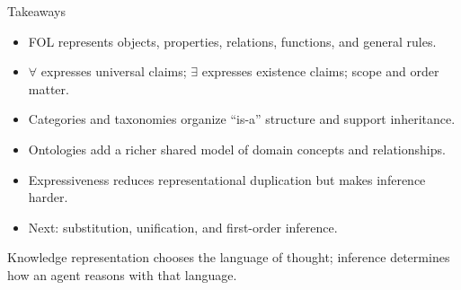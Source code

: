 \documentclass[aspectratio=169,10pt]{beamer}
\begin{document}
\begin{frame}[shrink=10]{Takeaways}
  \begin{itemize}
    \item FOL represents objects, properties, relations, functions, and general rules.
    \item $\forall$ expresses universal claims; $\exists$ expresses existence claims; scope and order matter.
    \item Categories and taxonomies organize ``is-a'' structure and support inheritance.
    \item Ontologies add a richer shared model of domain concepts and relationships.
    \item Expressiveness reduces representational duplication but makes inference harder.
    \item Next: substitution, unification, and first-order inference.
  \end{itemize}

  \begin{keyidea}
    Knowledge representation chooses the language of thought; inference determines how an agent reasons with that language.
  \end{keyidea}
\end{frame}
\end{document}

